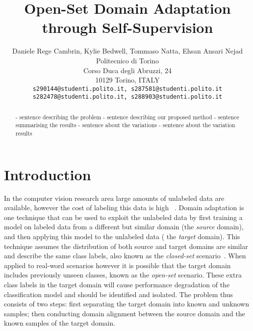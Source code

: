 \documentclass[10pt,twocolumn,letterpaper]{article}
\begin{document}
\title{Open-Set Domain Adaptation through Self-Supervision}

\author{Daniele Rege Cambrin, Kylie Bedwell, Tommaso Natta, Ehsan Ansari Nejad\\
Politecnico di Torino\\
Corso Duca degli Abruzzi, 24\\
10129 Torino, ITALY\\
{\tt\small s290144@studenti.polito.it, s287581@studenti.polito.it} \\
{\tt\small s282478@studenti.polito.it, s288903@studenti.polito.it}
}
\maketitle

\begin{abstract}
   - sentence describing the problem
 - sentence describing our proposed method
 - sentence summarising the results
 - sentence about the variations
 - sentence about the variation results
\end{abstract}

\section{Introduction}
\label{sec:intro}

In the computer vision research area large amounts of unlabeled data are available, however the cost of labeling this data is high ~\cite{Csurka2017}. Domain adaptation is one technique that can be used to exploit the unlabeled data by first training a model on labeled data from a different but similar domain (the \textit{source} domain), and then applying this model to the unlabeled data ( the \textit{target} domain). This technique assumes the distribution of both source and target domains are similar and describe the same class labels, also known as the \textit{closed-set} scenario~\cite{Bucci2020}. When applied to real-word scenarios however it is possible that the target domain includes previously unseen classes, known as the \textit{open-set} scenario. These extra class labels in the target domain will cause performance degradation of the classification model and should be identified and isolated. The problem thus consists of two steps: first separating the target domain into known and unknown samples; then conducting domain alignment between the source domain and the known samples of the target domain. 
\end{document}
